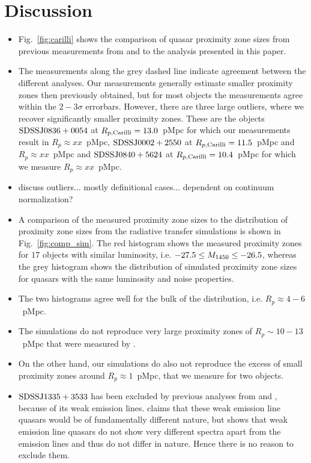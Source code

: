 \documentclass[iop]{emulateapj}
\begin{document}
\section{Discussion}\label{sec:discussion}

\begin{itemize}
\item Fig.~\ref{fig:carilli} shows the comparison of quasar proximity zone sizes from previous measurements from \citet{Carilli2010} and \citet{Venemans2015} to the analysis presented in this paper. 
\item The measurements along the grey dashed line indicate agreement between the different analyses. Our measurements generally estimate smaller proximity zones then previously obtained, but for most objects the measurements agree within the $2-3\sigma$ errorbars. However, there are three large outliers, where we recover significantly smaller proximity zones. These are the objects $\rm SDSS J0836+0054$ at $R_{p, \rm Carilli} = 13.0$~pMpc for which our measurements result in $R_p\approx xx$~pMpc, $\rm SDSS J0002+2550$ at $R_{p, \rm Carilli} = 11.5$~pMpc and $R_p\approx xx$~pMpc and $\rm SDSS J0840+5624$ at $R_{p, \rm Carilli} = 10.4$~pMpc for which we measure $R_p\approx xx$~pMpc. 
\item discuss outliers... mostly definitional cases... dependent on continuum normalization?
\item A comparison of the measured proximity zone sizes to the distribution of proximity zone sizes from the radiative transfer simulations is shown in Fig.~\ref{fig:comp_sim}. The red histogram shows the measured proximity zones for $17$ objects with similar luminosity, i.e. $-27.5\leq M_{\rm 1450}\leq -26.5$, whereas the grey histogram shows the distribution of simulated proximity zone sizes for quasars with the same luminosity and noise properties. 
\item The two histograms agree well for the bulk of the distribution, i.e. $R_p\approx 4-6$~pMpc. 
\item The simulations do not reproduce very large proximity zones of $R_p\sim 10-13$~pMpc that were measured by \citet{Carilli2010}. 
\item On the other hand, our simulations do also not reproduce the excess of small proximity zones around $R_p\approx 1$~pMpc, that we measure for two objects. 
\item $\rm SDSS J1335+3533$ has been excluded by previous analyses from \citet{Fan2006} and \citet{Carilli2010}, because of its weak emission lines. \citet{Carilli2010} claims that these weak emission line quasars would be of fundamentally different nature, but \citet{Diamond-Stanic2009} shows that weak emission line quasars do not show very different spectra apart from the emission lines and thus do not differ in nature. Hence there is no reason to exclude them. 

\end{itemize}
\end{document}
